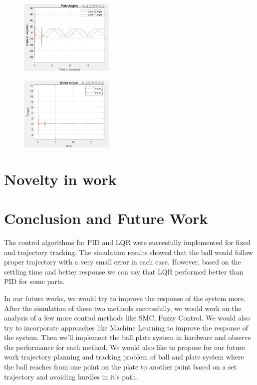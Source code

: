 \documentclass[conference]{IEEEtran}
\begin{document}
\begin{figure}[htbp]
\centerline{\includegraphics[width=0.4\textwidth]{DRCPALQR.png}}
\caption{}
\label{fig}
\end{figure}
\begin{figure}[htbp]
\centerline{\includegraphics[width=0.4\textwidth]{DRCMTLQR.png}}
\caption{}
\label{fig}
\end{figure}


\section{Novelty in work}

\section{Conclusion and Future Work}
The control algorithms for PID and LQR were succesfully implemented for fixed and trajectory tracking. The simulation results showed that the ball would follow proper trajectory with a very small error in each case. However, based on the settling time and better response we can say that LQR performed better than PID for some parts. 

In our future works, we would try to improve the response of the system more. After the simulation of these two methods successfully, we would work on the analysis of a few more control methods like SMC, Fuzzy Control. We would also try to incorporate approaches like Machine Learning to improve the response of the system. Then we'll implement the ball plate system in hardware and observe the performance for each method. We would also like to propose for our future work trajectory planning and tracking problem of ball and plate system where the ball reaches from one point on the plate to another point based on a set trajectory and avoiding hurdles in it's path.
\end{document}
